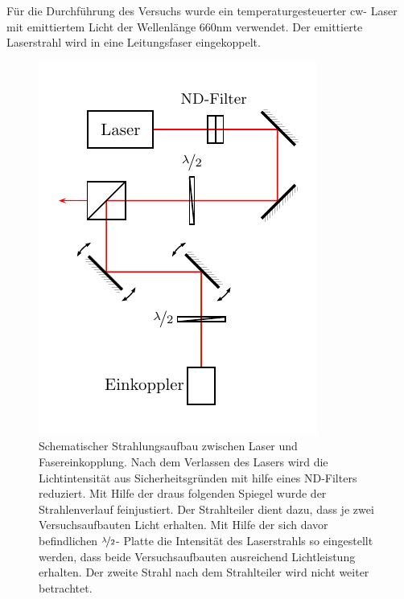 
Für die Durchführung des Versuchs wurde ein temperaturgesteuerter cw- Laser mit emittiertem Licht der Wellenlänge 660nm verwendet. Der emittierte Laserstrahl wird in eine Leitungsfaser eingekoppelt.

\begin{figure}[h]
	\centering
	\includegraphics[width=0.5\linewidth]{graphs/versuchsaufbau/lasereinheit}
	\caption[Schematischer Aufbau Lasereinheit]{
		Schematischer Strahlungsaufbau zwischen Laser und Fasereinkopplung. Nach dem Verlassen des Lasers wird die Lichtintensität aus Sicherheitsgründen mit hilfe eines ND-Filters reduziert. Mit Hilfe der draus folgenden Spiegel wurde der Strahlenverlauf feinjustiert. Der Strahlteiler dient dazu, dass je zwei Versuchsaufbauten Licht erhalten. Mit Hilfe der sich davor befindlichen $\nicefrac{\lambda}{2}$- Platte die Intensität des Laserstrahls so eingestellt werden, dass beide Versuchsaufbauten ausreichend Lichtleistung erhalten. Der zweite Strahl nach dem Strahlteiler wird nicht weiter betrachtet.
	}
	\label{fig:lasereinheit}
\end{figure}

